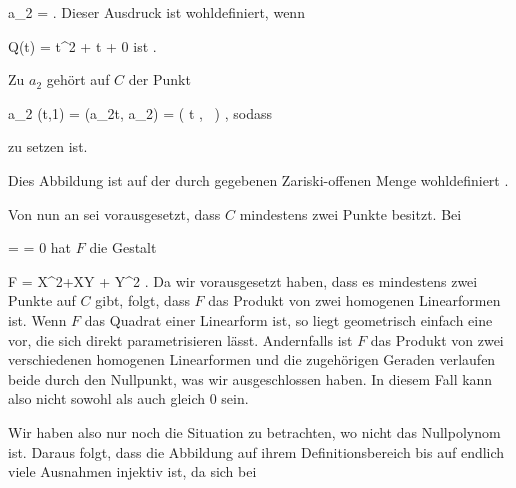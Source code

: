 {\mavergleichskettedisp
{\vergleichskette
{ a_2
}
{ =} { 
}
{ } {
}
{ } {
}
{ } {
}
}
{}{}{.}
Dieser Ausdruck ist wohldefiniert, wenn

\mavergleichskette
{\vergleichskette
{ Q(t)
}
{ = }{ t^2 + \beta t + \gamma
}
{ \neq }{ 0
}
{    }{
}
{   }{
}
}
{}{}{}
ist
 {} {.}

Zu $a_2$ gehört auf $C$ der Punkt

\mavergleichskettedisp
{\vergleichskette
{ a_2 (t,1)
}
{ =} { (a_2t, a_2)
}
{ =} { \left(  t    , \,                      \right)
}
{ } {
}
{ } {
}
}
{}{}{,}
sodass

 {  }

zu setzen ist.

Dies Abbildung ist auf der durch
 gegebenen Zariski-offenen Menge wohldefiniert
 {} {.}

Von nun an sei vorausgesetzt, dass $C$ mindestens zwei Punkte besitzt. Bei

\mavergleichskette
{\vergleichskette
{ \delta
}
{ = }{ \epsilon
}
{ = }{ 0
}
{    }{
}
{   }{
}
}
{}{}{}
hat $F$ die Gestalt

\mavergleichskette
{\vergleichskette
{ F
}
{ = }{ X^2+\beta XY + \gamma Y^2
}
{  }{
}
{    }{
}
{   }{
}
}
{}{}{.}
Da wir vorausgesetzt haben, dass es mindestens zwei Punkte auf $C$ gibt, folgt, dass $F$ das Produkt von zwei
 {} {}
homogenen Linearformen ist. Wenn $F$ das Quadrat einer Linearform ist, so liegt geometrisch einfach eine  vor, die sich direkt
 {} {}
parametrisieren lässt. Andernfalls ist $F$ das Produkt von zwei verschiedenen homogenen Linearformen und die zugehörigen Geraden verlaufen beide durch den Nullpunkt, was wir ausgeschlossen haben. In diesem Fall kann also nicht sowohl
\mathkor {} {\delta} {als auch} {\epsilon} {}
gleich $0$ sein.

Wir haben also nur noch die Situation zu betrachten, wo
 nicht das Nullpolynom ist. Daraus folgt, dass die Abbildung auf ihrem Definitionsbereich bis auf endlich viele Ausnahmen injektiv ist, da sich bei

}
